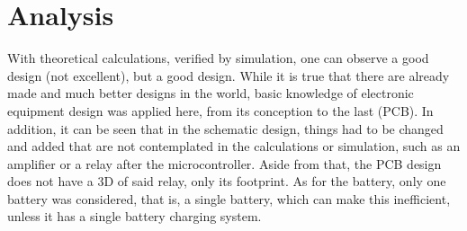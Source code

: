 \section{Analysis} 

With theoretical calculations, verified by simulation, one can observe a good design (not excellent), but a good design. While it is true that there are already made and much better designs in the world, basic knowledge of electronic equipment design was applied here, from its conception to the last (PCB). In addition, it can be seen that in the schematic design, things had to be changed and added that are not contemplated in the calculations or simulation, such as an amplifier or a relay after the microcontroller. Aside from that, the PCB design does not have a 3D of said relay, only its footprint. As for the battery, only one battery was considered, that is, a single battery, which can make this inefficient, unless it has a single battery charging system. 